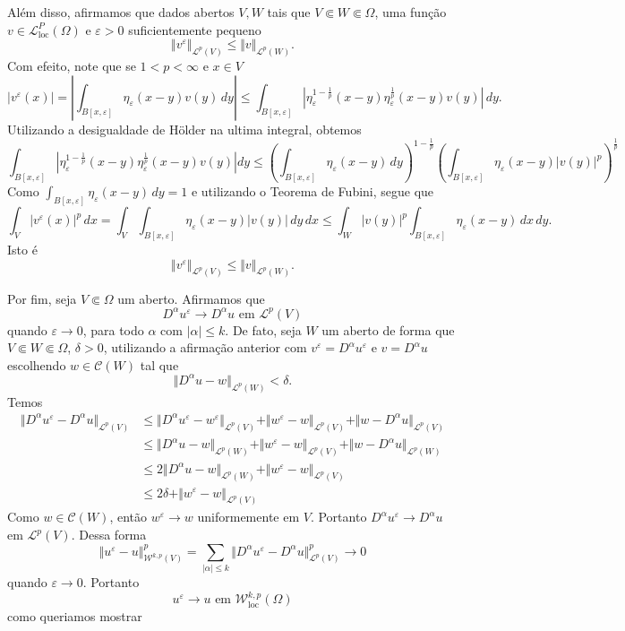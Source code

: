 \documentclass[a4paper, 11pt]{book}
\theoremstyle{definition}
\newcommand{\cC}{\mathcal{C}}
\newcommand{\cL}{\mathcal{L}}
\newcommand{\cW}{\mathcal{W}}
\newcommand{\loc}{\mathrm{loc}}
\begin{document}
\begin{prf}
    Além disso, afirmamos que dados abertos $V, W$ tais que $V \Subset W \Subset \Omega$, uma função $v \in \cL^P_\loc(\Omega)$ e $\varepsilon > 0$ suficientemente pequeno
    \[
        \Vert v^\varepsilon \Vert_{\cL^p(V)} \leqslant \Vert v \Vert_{\cL^p(W)}.
    \]
    Com efeito, note que se $1 < p < \infty$ e $x \in V$
    \[
        |v^\varepsilon(x)| = \left| \int_{B[x,\varepsilon]} \eta_\varepsilon(x-y) v (y) \,dy \right| \leqslant \int_{B[x,\varepsilon]} \left| \eta_\varepsilon^{1-\frac{1}{p}}(x-y) \eta_\varepsilon^{\frac{1}{p}}(x-y) v(y) \right| \,dy.
    \]
    Utilizando a desigualdade de Hölder na ultima integral, obtemos
    \[
        \int_{B[x,\varepsilon]} \left| \eta_\varepsilon^{1-\frac{1}{p}}(x-y) \eta_\varepsilon^{\frac{1}{p}}(x-y) v(y) \right|dy \leqslant \left( \int_{B[x,\varepsilon]} \eta_\varepsilon (x-y) \,dy\right)^{\!1-\frac{1}{p}} \left( \int_{B[x,\varepsilon]} \eta_\varepsilon(x-y) |v(y)|^p \right)^{\frac{1}{p}}
    \]
    Como $\int_{B[x,\varepsilon]} \eta_\varepsilon(x-y) \,dy = 1$ e utilizando o Teorema de Fubini, segue que
    \[
        \int_V |v^\varepsilon(x)|^p \,dx = \int_V \int_{B[x,\varepsilon]} \eta_\varepsilon(x-y) |v(y)| \,dy \,dx \leqslant \int_W |v(y)|^p \int_{B[x,\varepsilon]} \eta_\varepsilon(x-y) \,dx \,dy.
    \]
    Isto é
    \[
        \Vert v^\varepsilon \Vert_{\cL^p(V)} \leqslant \Vert v \Vert_{\cL^p(W)}.
    \]

    Por fim, seja $V \Subset \Omega$ um aberto. Afirmamos que
    \[
        D ^\alpha u^\varepsilon \to D^\alpha u \text{ em } \cL^p(V)
    \]
    quando $\varepsilon \to 0$, para todo $\alpha$ com $|\alpha| \leqslant k$.
    De fato, seja $W$ um aberto de forma que $V \Subset W \Subset \Omega$, $\delta > 0$, utilizando a afirmação anterior com $v ^\varepsilon = D^\alpha u^\varepsilon$ e $v = D^\alpha u$ escolhendo $w \in \cC(W)$ tal que
    \[
        \Vert D^\alpha u - w \Vert_{\cL^p(W)} < \delta.
    \]
    Temos
    \[
        \begin{aligned}
            \Vert D^\alpha u^\varepsilon - D^\alpha u \Vert_{\cL^p(V)} &\leqslant \Vert D^\alpha u^\varepsilon - w^\varepsilon \Vert_{\cL^p(V)} + \Vert w^\varepsilon - w \Vert_{\cL^p(V)} + \Vert w - D^\alpha u \Vert_{\cL^p(V)}\\
            &\leqslant \Vert D^\alpha u - w \Vert_{\cL^p(W)} + \Vert w^\varepsilon - w \Vert_{\cL^p(V)} + \Vert w - D^\alpha u \Vert_{\cL^p(W)}\\
            &\leqslant 2 \Vert D^\alpha u - w \Vert_{\cL^p(W)} + \Vert w^\varepsilon - w \Vert_{\cL^p(V)}\\
            &\leqslant 2\delta + \Vert w^\varepsilon - w \Vert_{\cL^p(V)}
        \end{aligned}
    \]
    Como $w \in \cC(W)$, então $w^\varepsilon \to w$ uniformemente em $V$. 
    Portanto $D^\alpha u^\varepsilon \to D^\alpha u$ em $\cL^p(V)$.
    Dessa forma
    \[
        \Vert u^\varepsilon - u \Vert^p_{\cW^{k,p}(V)} = \sum_{|\alpha| \leqslant k} \Vert D^\alpha u^\varepsilon - D^\alpha u \Vert^p_{\cL^p(V)} \to 0 
    \]
    quando $\varepsilon \to 0$. Portanto
    \[
        u^\varepsilon \to u \text{ em } \cW^{k,p}_\loc(\Omega)
    \]
    como queriamos mostrar
\end{prf}
\end{document}

